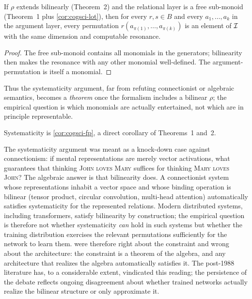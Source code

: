 \begin{corollary}\label{cor:cogsci-fp}
If $\rho$ extends bilinearly (Theorem~2) and the relational layer is a
free sub-monoid (Theorem~1 plus \cref{cor:cogsci-lot}), then for every
$r,s\in B$ and every $a_1,\dots,a_k$ in the argument layer, every
permutation $r(a_{\pi(1)},\dots,a_{\pi(k)})$ is an element of $\mathcal{I}$
with the same dimension and computable resonance.
\end{corollary}

\begin{proof}
The free sub-monoid contains all monomials in the generators; bilinearity
then makes the resonance with any other monomial well-defined. The
argument-permutation is itself a monomial. \qedhere
\end{proof}

Thus the systematicity argument, far from refuting connectionist or
algebraic semantics, becomes a \emph{theorem} once the formalism includes a
bilinear $\rho$; the empirical question is which monomials are actually
entertained, not which are in principle representable.

\formalstatus Systematicity is \cref{cor:cogsci-fp}, a direct corollary of
Theorems~1 and~2.

\litcomment The systematicity argument was meant as a knock-down case
against connectionism: if mental representations are merely vector
activations, what guarantees that thinking \textsc{John loves Mary}
suffices for thinking \textsc{Mary loves John}? The algebraic answer is
that bilinearity does. A connectionist system whose representations
inhabit a vector space and whose binding operation is bilinear (tensor
product, circular convolution, multi-head attention) automatically
satisfies systematicity for the represented relations. Modern
distributed systems, including transformers, satisfy bilinearity by
construction; the empirical question is therefore not whether
systematicity \emph{can} hold in such systems but whether the training
distribution exercises the relevant permutations sufficiently for the
network to learn them. \citet{FodorPylyshyn1988} were therefore right
about the constraint and wrong about the architecture: the constraint
is a theorem of the algebra, and any architecture that realizes the
algebra automatically satisfies it. The post-1988 literature has, to a
considerable extent, vindicated this reading; the persistence of the
debate reflects ongoing disagreement about whether trained networks
actually realize the bilinear structure or only approximate it.

